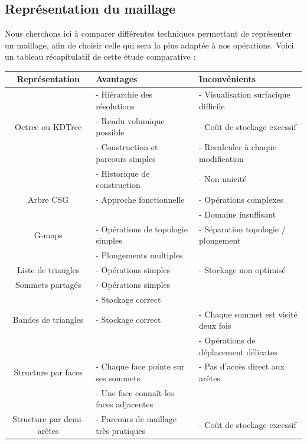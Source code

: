 \documentclass[a4paper]{memoir}
\begin{document}
			\subsection{Représentation du maillage}
				Nous cherchons ici à comparer différentes techniques permettant de représenter un maillage, afin de choisir celle qui sera la plus adaptée à 
				nos opérations. Voici un tableau récapitulatif de cette étude comparative :
				\begin{table}[H]
					\begin{small}
						\hspace{-2,5cm}
						\begin{tabular}{| c | l | l |}
							\hline
							\textbf{Représentation} & \textbf{Avantages} & \textbf{Inconvénients}\\
							\hline
							 & - Hiérarchie des résolutions & - Visualisation surfacique difficile\\
							Octree ou KDTree & - Rendu volumique possible & - Coût de stockage excessif\\
							 & - Construction et parcours simples & - Recalculer à chaque modification\\
							\hline
							 & - Historique de construction & - Non unicité\\
							Arbre CSG & - Approche fonctionnelle & - Opérations complexes\\
							 &  & - Domaine insuffisant\\
							\hline
							G-maps & - Opérations de topologie simples & - Séparation topologie / plongement\\
							 & - Plongements multiples & \\
							\hline
							Liste de triangles & - Opérations simples & - Stockage non optimisé\\
							\hline
							Sommets partagés & - Opérations simples & \\
							 & - Stockage correct & \\
							\hline
							Bandes de triangles & - Stockage correct & - Chaque sommet est visité deux fois\\
							 &  & - Opérations de déplacement délicates\\
							\hline
							Structure par faces & - Chaque face pointe sur ses sommets & - Pas d'accès direct aux arêtes\\
							 & - Une face connaît les faces adjacentes & \\
							\hline
							Structure par demi-arêtes & - Parcours de maillage très pratiques & - Coût de stockage excessif\\

\end{tabular}
\end{small}
\end{table}
\end{document}
